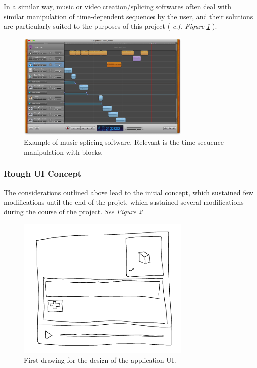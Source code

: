 In a similar way, music or video creation/splicing softwares often deal with similar manipulation of time-dependent sequences by the user, and their solutions are particularly suited to the purposes of this project ( \textit{c.f. Figure \ref{img:MusicEditor}} ).\\

\begin{figure}[ht]
   \centering
   \includegraphics[width=0.75\textwidth]{img/MusicEditor.png}
   \caption{Example of music splicing software. Relevant is the time-sequence manipulation with blocks.}
   \label{img:MusicEditor}
\end{figure}


\subsubsection{Rough UI Concept}

The considerations outlined above lead to the initial concept, which sustained few modifications until the end of the projet, which sustained several modifications during the course of the project.
\textit{See Figure \ref{img:AppConcept}}

\begin{figure}[ht]
   \centering
   \includegraphics[width=0.75\textwidth]{img/AppConcept.png}
   \caption{First drawing for the design of the application UI.}
   \label{img:AppConcept}
\end{figure}


